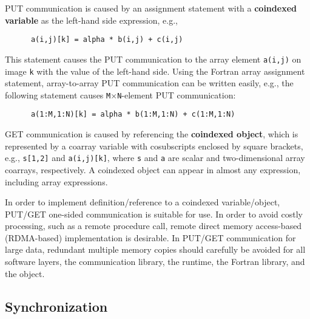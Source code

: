 PUT communication is caused by an assignment statement with a {\bf coindexed variable} 
as the left-hand side expression, e.g.,
\begin{verbatim}
      a(i,j)[k] = alpha * b(i,j) + c(i,j)
\end{verbatim}
This statement causes the PUT communication to the array element {\tt a(i,j)}
on image {\tt k} with the value of the left-hand side.
%
Using the Fortran array assignment statement, array-to-array PUT communication 
can be written easily, e.g., the following statement causes 
{\tt M}$\times${\tt N}-element PUT communication:
\begin{verbatim}
      a(1:M,1:N)[k] = alpha * b(1:M,1:N) + c(1:M,1:N)
\end{verbatim}

GET communication is caused by referencing the {\bf coindexed object}, 
which is represented by a coarray variable with cosubscripts enclosed by square brackets, 
e.g., {\tt s[1,2]} and {\tt a(i,j)[k]}, where {\tt s} and {\tt a} are scalar and 
two-dimensional array coarrays, respectively.
%
A coindexed object can appear in almost any expression, including array expressions.

\requirement
In order to implement definition/reference to a coindexed variable/object,
PUT/GET one-sided communication is suitable for use.
%
In order to avoid costly processing, such as a remote procedure call, 
remote direct memory access-based (RDMA-based) implementation is desirable.
%
In PUT/GET communication for large data, redundant multiple memory copies 
should carefully be avoided for all software layers, 
the communication library, the runtime, the Fortran library, and the object.



\subsection{Synchronization}\label{sec:spec-sync}

